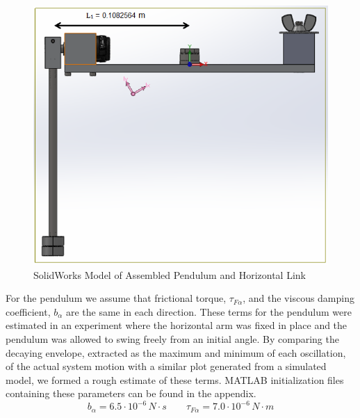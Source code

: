 \documentclass{article}
\theoremstyle{plain}
\theoremstyle{definition}
\theoremstyle{remark}
\begin{document}
\begin{figure}[htb]
\begin{center}
\includegraphics[width = 14cm]{CompleteArm.png}
\caption{SolidWorks Model of Assembled Pendulum and Horizontal Link}
\label{q2_5}
\end{center}
\end{figure}

For the pendulum we assume that frictional torque, $\tau_{F \alpha}$, and the viscous damping coefficient, $b_{\alpha}$ are the same in each direction. These terms for the pendulum were estimated in an experiment where the horizontal arm was fixed in place and the pendulum was allowed to swing freely from an initial angle.  By comparing the decaying envelope, extracted as the maximum and minimum of each oscillation, of the actual system motion with a similar plot generated from a simulated model, we formed a rough estimate of these terms. MATLAB initialization files containing these parameters can be found in the appendix.\\

$$b_{\alpha} = 6.5\cdot10^{-6}\, N\cdot s \qquad \tau_{F \alpha} = 7.0\cdot10^{-6} \, N\cdot m$$
\end{document}
